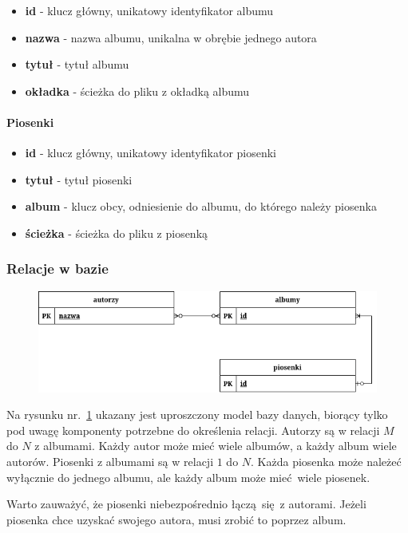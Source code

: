 \begin{itemize}
	\item \textbf{id} - klucz główny, unikatowy identyfikator albumu
	
	\item \textbf{nazwa} - nazwa albumu, unikalna w obrębie jednego autora
	
	\item \textbf{tytuł} - tytuł albumu

	\item \textbf{okładka} - ścieżka do pliku z okładką albumu
\end{itemize}

\paragraph{Piosenki}

\begin{itemize}
	\item \textbf{id} - klucz główny, unikatowy identyfikator piosenki
	
	\item \textbf{tytuł} - tytuł piosenki
	
	\item \textbf{album} - klucz obcy, odniesienie do albumu, do którego należy piosenka
	
	\item \textbf{ścieżka} - ścieżka do pliku z piosenką
\end{itemize}

\subsubsection{Relacje w bazie} \label{sec:dbrelations}

\begin{figure}[H]
	\centering
	\includegraphics[width=1\textwidth]{images/ch3-db-relacje.drawio.png}
	\caption{}
	\label{fig:dbrelations}
\end{figure}

Na rysunku nr.~\ref{fig:dbrelations} ukazany jest uproszczony model bazy danych, biorący tylko pod uwagę komponenty potrzebne do określenia relacji. Autorzy są w relacji $M$ do $N$ z albumami. Każdy autor może mieć wiele albumów, a każdy album wiele autorów. Piosenki z albumami są w relacji $1$ do $N$. Każda piosenka może należeć wyłącznie do jednego albumu, ale każdy album może mieć wiele piosenek.

Warto zauważyć, że piosenki niebezpośrednio łączą się z autorami. Jeżeli piosenka chce uzyskać swojego autora, musi zrobić to poprzez album.
